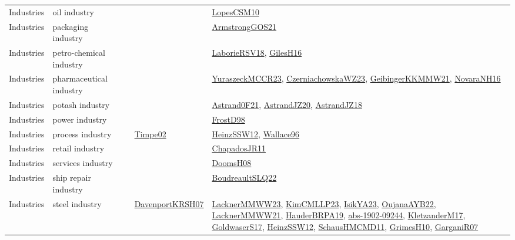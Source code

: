 {\begin{longtable}{lp{3cm}>{\raggedright}p{6cm}>{\raggedright}p{6cm}p{8cm}}
Industries & oil industry &  &  & \href{articles/LopesCSM10.pdf}{LopesCSM10}\cite{LopesCSM10}\\
Industries & packaging industry &  &  & \href{papers/ArmstrongGOS21.pdf}{ArmstrongGOS21}\cite{ArmstrongGOS21}\\
Industries & petro-chemical industry &  &  & \href{articles/LaborieRSV18.pdf}{LaborieRSV18}\cite{LaborieRSV18}, \href{papers/GilesH16.pdf}{GilesH16}\cite{GilesH16}\\
Industries & pharmaceutical industry &  &  & \href{articles/YuraszeckMCCR23.pdf}{YuraszeckMCCR23}\cite{YuraszeckMCCR23}, \href{articles/CzerniachowskaWZ23.pdf}{CzerniachowskaWZ23}\cite{CzerniachowskaWZ23}, \href{papers/GeibingerKKMMW21.pdf}{GeibingerKKMMW21}\cite{GeibingerKKMMW21}, \href{articles/NovaraNH16.pdf}{NovaraNH16}\cite{NovaraNH16}\\
Industries & potash industry &  &  & \href{papers/Astrand0F21.pdf}{Astrand0F21}\cite{Astrand0F21}, \href{articles/AstrandJZ20.pdf}{AstrandJZ20}\cite{AstrandJZ20}, \href{papers/AstrandJZ18.pdf}{AstrandJZ18}\cite{AstrandJZ18}\\
Industries & power industry &  &  & \href{papers/FrostD98.pdf}{FrostD98}\cite{FrostD98}\\
Industries & process industry &  & \href{articles/Timpe02.pdf}{Timpe02}\cite{Timpe02} & \href{articles/HeinzSSW12.pdf}{HeinzSSW12}\cite{HeinzSSW12}, \href{articles/Wallace96.pdf}{Wallace96}\cite{Wallace96}\\
Industries & retail industry &  &  & \href{papers/ChapadosJR11.pdf}{ChapadosJR11}\cite{ChapadosJR11}\\
Industries & services industry &  &  & \href{papers/DoomsH08.pdf}{DoomsH08}\cite{DoomsH08}\\
Industries & ship repair industry &  &  & \href{papers/BoudreaultSLQ22.pdf}{BoudreaultSLQ22}\cite{BoudreaultSLQ22}\\
Industries & steel industry &  & \href{papers/DavenportKRSH07.pdf}{DavenportKRSH07}\cite{DavenportKRSH07} & \href{articles/LacknerMMWW23.pdf}{LacknerMMWW23}\cite{LacknerMMWW23}, \href{papers/KimCMLLP23.pdf}{KimCMLLP23}\cite{KimCMLLP23}, \href{articles/IsikYA23.pdf}{IsikYA23}\cite{IsikYA23}, \href{papers/OujanaAYB22.pdf}{OujanaAYB22}\cite{OujanaAYB22}, \href{papers/LacknerMMWW21.pdf}{LacknerMMWW21}\cite{LacknerMMWW21}, \href{articles/HauderBRPA19.pdf}{HauderBRPA19}\cite{HauderBRPA19}, \href{articles/abs-1902-09244.pdf}{abs-1902-09244}\cite{abs-1902-09244}, \href{papers/KletzanderM17.pdf}{KletzanderM17}\cite{KletzanderM17}, \href{papers/GoldwaserS17.pdf}{GoldwaserS17}\cite{GoldwaserS17}, \href{articles/HeinzSSW12.pdf}{HeinzSSW12}\cite{HeinzSSW12}, \href{articles/SchausHMCMD11.pdf}{SchausHMCMD11}\cite{SchausHMCMD11}, \href{papers/GrimesH10.pdf}{GrimesH10}\cite{GrimesH10}, \href{papers/GarganiR07.pdf}{GarganiR07}\cite{GarganiR07}\\

\end{longtable}}
